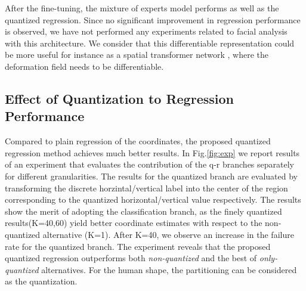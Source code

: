 After the fine-tuning, the mixture of experts model performs as well as the quantized regression. Since no significant improvement in regression performance is observed, we have not performed any experiments related to facial analysis with this architecture. We consider that this differentiable representation could be more useful for instance as a spatial transformer network \cite{jaderberg2015spatial}, where the deformation field needs to be differentiable. 


\subsection{Effect of Quantization to Regression Performance}
\label{sec: quantization_perf}


Compared to plain regression of the coordinates, the proposed quantized regression method achieves much better results. 
In Fig.\ref{fig:exp} we report results of an experiment that evaluates the contribution of the q-r branches separately for different granularities. The results for the quantized branch are evaluated by transforming the discrete horzintal/vertical label into the center of the region corresponding to the quantized horizontal/vertical value respectively.  The results  show the merit of adopting the classification branch, as the finely quantized results(K=40,60) yield  better coordinate estimates with respect to the non-quantized alternative {(K=1)}. After K=40, we observe an increase in the failure rate for the quantized branch. The experiment reveals that the proposed quantized regression outperforms both \textit{non-quantized} and the best of \textit{only-quantized} alternatives. For the human shape, the partitioning can be considered as the quantization.

